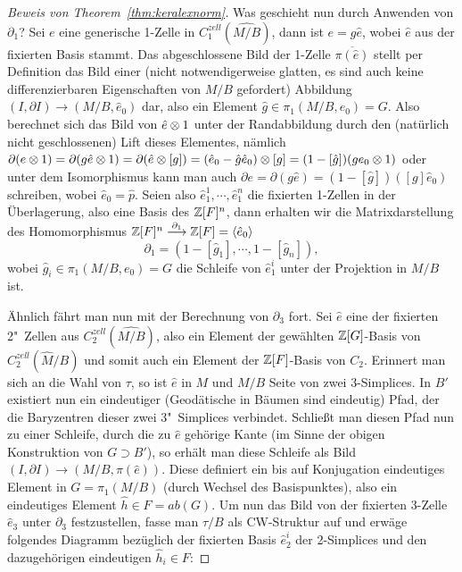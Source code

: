 \begin{proof}[Beweis von Theorem~\ref{thm:keralexnorm}]
	Was geschieht nun durch Anwenden von $\partial_1$? Sei $e$ eine generische 1-Zelle in $C_1^{zell}(\widehat{ M/B})$, dann ist $e=g\hat e$, wobei $\hat e$ aus der fixierten Basis stammt. Das abgeschlossene Bild der 1-Zelle $\overline{\pi(\hat e)}$ stellt per Definition das Bild einer (nicht notwendigerweise glatten, es sind auch keine differenzierbaren Eigenschaften von $M/B$ gefordert) Abbildung $(I,\partial I) \to (M/B,\hat e_0)$ dar, also ein Element $\hat g \in \pi_1(M/B,e_0) = G$. Also berechnet sich das Bild von $\hat e \otimes 1$ unter der Randabbildung durch den (natürlich nicht geschlossenen) Lift dieses Elementes, nämlich $\partial(e\otimes 1)=\partial(g \hat e \otimes 1) = \partial(\hat e \otimes [g])= (\hat e_0 - \hat g \hat e_0)\otimes [g] = (1-[\hat g]) (ge_0\otimes 1)$ oder unter dem Isomorphismus kann man auch $\partial e = \partial(g\hat e)= (1-[\hat g])([g]\hat e_0) $ schreiben, wobei $\hat e_0=\hat p$. Seien also $\hat e_1^1 ,\cdots, \hat e_1^n$ die fixierten 1-Zellen in der Überlagerung, also eine Basis des $\mathbb{Z}[F]^n$, dann erhalten wir die Matrixdarstellung des Homomorphismus $\mathbb{Z}[F]^n \stackrel {\partial_1} \longrightarrow \mathbb{Z}[F]=\langle \hat e_0\rangle$
	\[
		\partial_1 = (1-[\hat g_1], \cdots , 1- [\hat g_n]) ,
	\]
	wobei $\hat g_i \in \pi_1(M/B,e_0)=G$ die Schleife von $\hat e_1^i$ unter der Projektion in $M/B$ ist.

	Ähnlich fährt man nun mit der Berechnung von $\partial_3$ fort. Sei $\hat e$ eine der fixierten 2"~Zellen aus $C_2^{zell}(\widehat{ M/B})$, also ein Element der gewählten $\mathbb{Z}[G]$-Basis von $C_2^{zell}(\widehat M/B)$ und somit auch ein Element der $\mathbb{Z}[F]$-Basis von $C_2$. Erinnert man sich an die Wahl von $\tau$, so ist $\hat e$ in $M$ und $M/B$ Seite von zwei 3-Simplices. In $B'$ existiert nun ein eindeutiger (Geodätische in Bäumen sind eindeutig) Pfad, der die Baryzentren dieser zwei 3"~Simplices verbindet. Schließt man diesen Pfad nun zu einer Schleife, durch die zu $\hat e$ gehörige Kante (im Sinne der obigen Konstruktion von $G\supset B'$), so erhält man diese Schleife als Bild $(I,\partial I) \to (M/B,\pi(\hat e))$. Diese definiert ein bis auf Konjugation eindeutiges Element in $G=\pi_1(M/B)$ (durch Wechsel des Basispunktes), also ein eindeutiges Element $\hat h \in F =ab(G)$. Um nun das Bild von der fixierten 3-Zelle $\hat e_3$ unter $\partial_3$ festzustellen, fasse man $\tau/B$ als CW-Struktur auf und erwäge folgendes Diagramm bezüglich der fixierten Basis $\hat e_2^i$ der 2-Simplices und den dazugehörigen eindeutigen $\hat h_i \in F$:
	

\end{proof}
